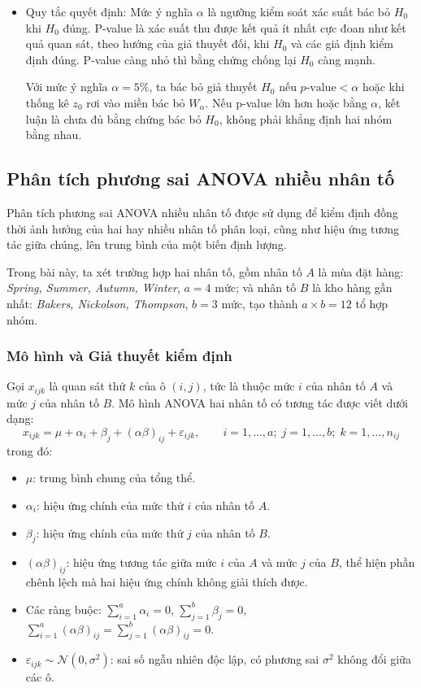 \begin{itemize}
		\item Quy tắc quyết định: Mức ý nghĩa $\alpha$ là ngưỡng kiểm soát xác suất bác bỏ $H_0$ khi $H_0$ đúng. P-value là xác suất thu được kết quả ít nhất cực đoan như kết quả quan sát, theo hướng của giả thuyết đối, khi $H_0$ và các giả định kiểm định đúng. P-value càng nhỏ thì bằng chứng chống lại $H_0$ càng mạnh.
		
		Với mức ý nghĩa $\alpha = 5\%$, ta bác bỏ giả thuyết $H_0$ nếu $p\text{-value} < \alpha$ hoặc khi thống kê $z_0$ rơi vào miền bác bỏ $W_\alpha$. Nếu p-value lớn hơn hoặc bằng $\alpha$, kết luận là chưa đủ bằng chứng bác bỏ $H_0$, không phải khẳng định hai nhóm bằng nhau.
	\end{itemize}
	
	\subsection{Phân tích phương sai ANOVA nhiều nhân tố }
	
	Phân tích phương sai ANOVA nhiều nhân tố được sử dụng để kiểm định đồng thời ảnh hưởng của hai hay nhiều nhân tố phân loại, cũng như hiệu ứng tương tác giữa chúng, lên trung bình của một biến định lượng. 
	
	Trong bài này, ta xét trường hợp hai nhân tố, gồm nhân tố $A$ là mùa đặt hàng: \textit{Spring, Summer, Autumn, Winter}, $a = 4$ mức; và nhân tố $B$ là kho hàng gần nhất: \textit{Bakers, Nickolson, Thompson}, $b = 3$ mức, tạo thành $a \times b = 12$ tổ hợp nhóm. 
	
	\subsubsection{Mô hình và Giả thuyết kiểm định}
	
	Gọi $x_{ijk}$ là quan sát thứ $k$ của ô $(i, j)$, tức là thuộc mức $i$ của nhân tố $A$ và mức $j$ của nhân tố $B$. Mô hình ANOVA hai nhân tố có tương tác được viết dưới dạng:
	\begin{equation}
		x_{ijk} = \mu + \alpha_i + \beta_j + (\alpha\beta)_{ij} + \varepsilon_{ijk}, \qquad i = 1, \dots, a;\; j = 1, \dots, b;\; k = 1, \dots, n_{ij}
	\end{equation}
	trong đó:
	\begin{itemize}
		\item $\mu$: trung bình chung của tổng thể.
		\item $\alpha_i$: hiệu ứng chính của mức thứ $i$ của nhân tố $A$.
		\item $\beta_j$: hiệu ứng chính của mức thứ $j$ của nhân tố $B$.
		\item $(\alpha\beta)_{ij}$: hiệu ứng tương tác giữa mức $i$ của $A$ và mức $j$ của $B$, thể hiện phần chênh lệch mà hai hiệu ứng chính không giải thích được.
		\item Các ràng buộc: $\sum_{i=1}^{a} \alpha_i = 0$, $\sum_{j=1}^{b} \beta_j = 0$, $\sum_{i=1}^{a} (\alpha\beta)_{ij} = \sum_{j=1}^{b} (\alpha\beta)_{ij} = 0$.
		\item $\varepsilon_{ijk} \sim \mathcal{N}(0, \sigma^2)$: sai số ngẫu nhiên độc lập, có phương sai $\sigma^2$ không đổi giữa các ô.
	\end{itemize}
	
